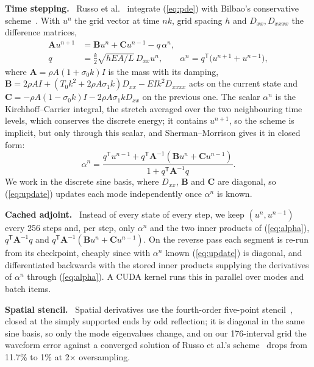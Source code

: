 \documentclass[a4paper]{article}
\newcommand{\head}[1]{\par\vspace{2pt}\noindent\textbf{#1.}\ \ignorespaces}
\begin{document}
\begin{sloppy}
\head{Time stepping}
Russo et al.~\cite{russo2026} integrate (\ref{eq:pde}) with Bilbao's
conservative scheme~\cite{bilbao2009}. With $u^{n}$ the grid vector at time
$nk$, grid spacing $h$ and $D_{xx},D_{xxxx}$ the difference matrices,
\begin{equation}
\begin{aligned}
\mathbf{A}u^{n+1}&=\mathbf{B}u^{n}+\mathbf{C}u^{n-1}-q\,\alpha^n,\\
q&=\tfrac{k}{2}\sqrt{hEA/L}\,D_{xx}u^{n},\qquad
\alpha^n=q^{\mathsf T}\big(u^{n+1}+u^{n-1}\big),
\end{aligned}
\label{eq:update}
\end{equation}
where $\mathbf{A}=\rho A(1+\sigma_0k)I$ is the mass with its damping,
$\mathbf{B}=2\rho AI+(T_0k^2+2\rho A\sigma_1k)D_{xx}-EIk^2D_{xxxx}$ acts on the
current state and $\mathbf{C}=-\rho A(1-\sigma_0k)I-2\rho A\sigma_1kD_{xx}$ on
the previous one. The scalar $\alpha^n$ is the Kirchhoff--Carrier integral, the
stretch averaged over the two neighbouring time levels, which conserves the
discrete energy; it contains $u^{n+1}$, so the scheme is implicit, but only
through this scalar, and Sherman--Morrison gives it in closed form:
\begin{equation}
\alpha^n=\frac{q^{\mathsf T}u^{n-1}+q^{\mathsf T}\mathbf{A}^{-1}
 (\mathbf{B}u^{n}+\mathbf{C}u^{n-1})}{1+q^{\mathsf T}\mathbf{A}^{-1}q}.
\label{eq:alpha}
\end{equation}
We work in the discrete sine basis, where $D_{xx}$, $\mathbf{B}$ and
$\mathbf{C}$ are diagonal, so (\ref{eq:update}) updates each mode independently
once $\alpha^n$ is known.

\head{Cached adjoint}
Instead of every state of every step, we keep $(u^{n},u^{n-1})$ every 256 steps
and, per step, only $\alpha^n$ and the two inner products of (\ref{eq:alpha}),
$q^{\mathsf T}\mathbf{A}^{-1}q$ and
$q^{\mathsf T}\mathbf{A}^{-1}(\mathbf{B}u^{n}+\mathbf{C}u^{n-1})$. On the reverse
pass each segment is re-run from its checkpoint, cheaply since with $\alpha^n$
known (\ref{eq:update}) is diagonal, and differentiated backwards with the
stored inner products supplying the derivatives of $\alpha^n$ through
(\ref{eq:alpha}). A CUDA kernel runs this in parallel over modes and batch
items.

\head{Spatial stencil}
Spatial derivatives use the fourth-order five-point
stencil~\cite{bilbao2009}, closed at the simply supported ends by odd
reflection; it is diagonal in the same sine basis, so only the mode
eigenvalues change, and on our 176-interval grid the waveform error against
a converged solution of Russo et al.'s scheme~\cite{russo2026} drops from
11.7\% to 1\% at 2$\times$ oversampling.


\end{sloppy}
\end{document}
